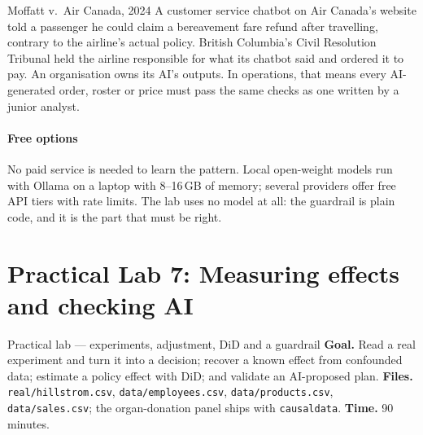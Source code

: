 \begin{realcase}{Moffatt v.\ Air Canada, 2024}
A customer service chatbot on Air Canada's website told a passenger he could claim a bereavement fare refund after
travelling, contrary to the airline's actual policy. British Columbia's Civil Resolution Tribunal held the airline
responsible for what its chatbot said and ordered it to pay. An organisation owns its AI's outputs. In operations, that
means every AI-generated order, roster or price must pass the same checks as one written by a junior analyst.
\end{realcase}

\paragraph{Free options} No paid service is needed to learn the pattern. Local open-weight models run with Ollama on a
laptop with 8--16\,GB of memory; several providers offer free API tiers with rate limits. The lab uses no model at all:
the guardrail is plain code, and it is the part that must be right.

\section{Practical Lab 7: Measuring effects and checking AI}
\begin{labbox}{Practical lab --- experiments, adjustment, DiD and a guardrail}
\textbf{Goal.} Read a real experiment and turn it into a decision; recover a known effect from confounded data;
estimate a policy effect with DiD; and validate an AI-proposed plan. \textbf{Files.} \texttt{real/hillstrom.csv},
\texttt{data/employees.csv}, \texttt{data/products.csv}, \texttt{data/sales.csv}; the organ-donation panel ships with
\texttt{causaldata}. \textbf{Time.} 90 minutes.
\end{labbox}



